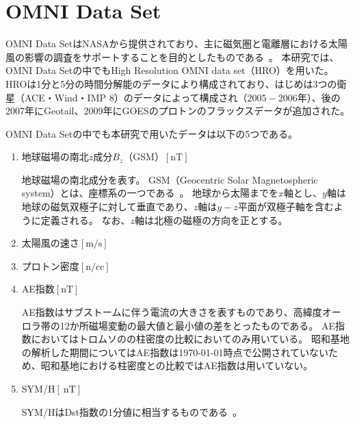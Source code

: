 \chapter{OMNI Data Set}
\label{app:omni}
OMNI Data SetはNASAから提供されており、主に磁気圏と電離層における太陽風の影響の調査をサポートすることを目的としたものである~\cite{king2005solar,king2023omni}。
本研究では、OMNI Data Setの中でもHigh Resolution OMNI data set（HRO）を用いた。
HROは1分と5分の時間分解能のデータにより構成されており、はじめは3つの衛星（ACE・Wind・IMP 8）のデータによって構成され（$2005-2006$年）、後の2007年にGeotail、2009年にGOESのプロトンのフラックスデータが追加された。
\par
OMNI Data Setの中でも本研究で用いたデータは以下の5つである。
\begin{enumerate}
    \item 地球磁場の南北$z$成分$B_z$（GSM）$[\mathrm{nT}]$
    \par
    地球磁場の南北成分を表す。
    GSM（Geocentric Solar Magnetospheric system）とは、座標系の一つである~\cite{russell1971geophysical}。
    地球から太陽までを$x$軸とし、$y$軸は地球の磁気双極子に対して垂直であり、$z$軸は$y-z$平面が双極子軸を含むように定義される。
    なお、$z$軸は北極の磁極の方向を正とする。

    \item 太陽風の速さ$[\mathrm{m/s}]$
    \item プロトン密度$[\mathrm{n/cc}]$
    \item AE指数$[\mathrm{nT}]$
    \par
    AE指数はサブストームに伴う電流の大きさを表すものであり、高緯度オーロラ帯の12か所磁場変動の最大値と最小値の差をとったものである。
    AE指数においてはトロムソのの柱密度の比較においてのみ用いている。
    昭和基地の解析した期間についてはAE指数は\today 時点で公開されていないため、昭和基地における柱密度との比較ではAE指数は用いていない。

    \item SYM/H$[\ \mathrm{nT}]$
    \par
    SYM/HはDst指数の1分値に相当するものである~\cite{wdc2009asysym}。

\end{enumerate}



